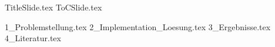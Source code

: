 \documentclass[aspectratio=\SetBeamerAspectRatio, 15pt]{beamer}
\begin{document}
{TitleSlide.tex}
{ToCSlide.tex}

{1_Problemstellung.tex}
{2_Implementation_Loesung.tex}
{3_Ergebnisse.tex}
{4_Literatur.tex}
\end{document}
